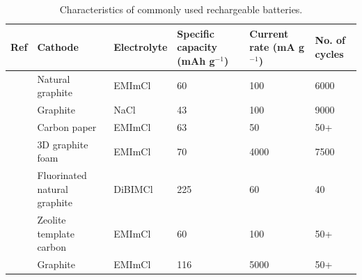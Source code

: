 \begin{table}
\caption{Characteristics of commonly used rechargeable batteries.} \label{table2xps}
\begin{center}
\begin{tabular}{ |p{0.5cm}|p{2.5cm}|p{2cm}|p{2.5cm}|p{2.5cm}|p{1.5cm}|}
\hline
\textbf{Ref} & \textbf{Cathode} & \textbf{Electrolyte} & \textbf{Specific capacity (mAh g$^{-1}$)} & \textbf{Current rate (mA g$^{-1}$)} & \textbf{No. of cycles} \\
\hline
\cite{wang_advanced_2017} & Natural graphite & EMImCl & 60 & 100 & 6000 \\
\cite{song_long-life_2017} & Graphite & NaCl & 43 & 100 & 9000 \\
\cite{sun_new_2015} & Carbon paper & EMImCl & 63 & 50 & 50+ \\
\cite{lin_ultrafast_2015-3} & 3D graphite foam & EMImCl & 70 & 4000 & 7500 \\
\cite{rani_fluorinated_2013} & Fluorinated natural graphite & DiBIMCl & 225 & 60 & 40 \\
\cite{stadie_zeolite-templated_2017} & Zeolite template carbon & EMImCl & 60 & 100 & 50+ \\
& Graphite & EMImCl & 116 & 5000 & 50+ \\

\hline
\end{tabular}
\end{center}
\end{table}

